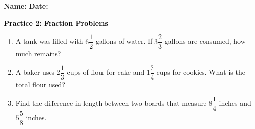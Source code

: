 \documentclass[12pt, letterpaper, fleqn]{article}
\begin{document}
\textbf{Name:} \underline{\hspace{5cm}}
\hfill
\textbf{Date:} \underline{\hspace{3cm}}\\

\begin{tcolorbox}[colback=customteal!20]
    \large\textcolor{black}{\textbf{Practice 2: Fraction Problems}}
\end{tcolorbox}
\begin{enumerate}[itemsep=3.5cm, leftmargin=0.6cm]
\item A tank was filled with $6\dfrac{1}{2}$ gallons of water. If $3\dfrac{2}{3}$ gallons are consumed, how much remains?
\vspace{3.5cm}
\item A baker uses $2\dfrac{1}{3}$ cups of flour for cake and $1\dfrac{3}{4}$ cups for cookies. What is the total flour used?
\vspace{3.5cm}
\item Find the difference in length between two boards that measure $8\dfrac{1}{4}$ inches and $5\dfrac{5}{8}$ inches.
\end{enumerate}
\end{document}
